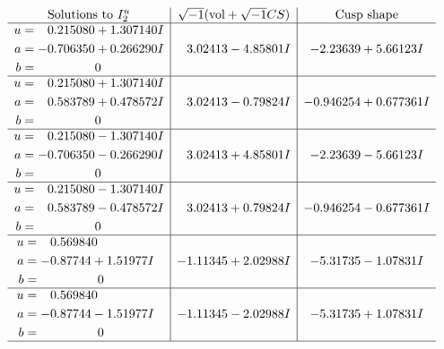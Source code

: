 \documentclass[1p]{elsarticle_modified}
\theoremstyle{definition}
\newcommand{\I}{\sqrt{-1}}
\begin{document}
$$\begin{array}{c|c|c}  
\text{Solutions to }I^u_{2}& \I (\text{vol} + \sqrt{-1}CS) & \text{Cusp shape}\\
 \hline 
\begin{aligned}
u &= \phantom{-}0.215080 + 1.307140 I \\
a &= -0.706350 + 0.266290 I \\
b &= \phantom{-0.000000 } 0\end{aligned}
 & \phantom{-}3.02413 - 4.85801 I & -2.23639 + 5.66123 I \\ \hline\begin{aligned}
u &= \phantom{-}0.215080 + 1.307140 I \\
a &= \phantom{-}0.583789 + 0.478572 I \\
b &= \phantom{-0.000000 } 0\end{aligned}
 & \phantom{-}3.02413 - 0.79824 I & -0.946254 + 0.677361 I \\ \hline\begin{aligned}
u &= \phantom{-}0.215080 - 1.307140 I \\
a &= -0.706350 - 0.266290 I \\
b &= \phantom{-0.000000 } 0\end{aligned}
 & \phantom{-}3.02413 + 4.85801 I & -2.23639 - 5.66123 I \\ \hline\begin{aligned}
u &= \phantom{-}0.215080 - 1.307140 I \\
a &= \phantom{-}0.583789 - 0.478572 I \\
b &= \phantom{-0.000000 } 0\end{aligned}
 & \phantom{-}3.02413 + 0.79824 I & -0.946254 - 0.677361 I \\ \hline\begin{aligned}
u &= \phantom{-}0.569840\phantom{ +0.000000I} \\
a &= -0.87744 + 1.51977 I \\
b &= \phantom{-0.000000 } 0\end{aligned}
 & -1.11345 + 2.02988 I & -5.31735 - 1.07831 I \\ \hline\begin{aligned}
u &= \phantom{-}0.569840\phantom{ +0.000000I} \\
a &= -0.87744 - 1.51977 I \\
b &= \phantom{-0.000000 } 0\end{aligned}
 & -1.11345 - 2.02988 I & -5.31735 + 1.07831 I\\
 \hline 
 \end{array}$$\newpage
\end{document}
